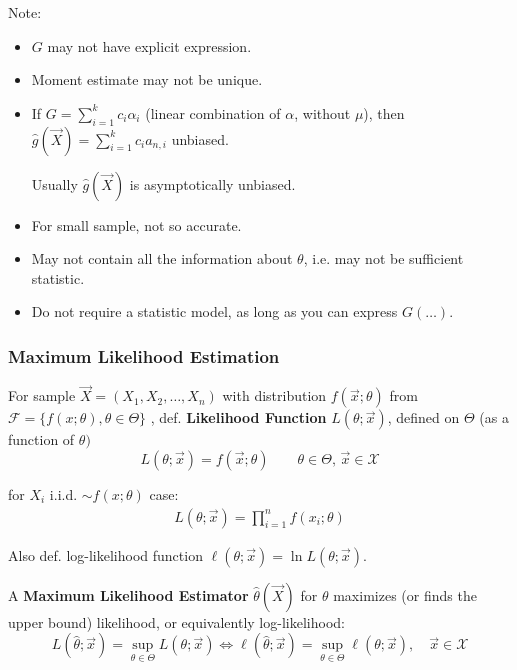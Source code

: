     \begin{point}
        Note:
    \end{point}
    
        
    \begin{itemize}
        \item $G$ may not have explicit expression.
        \item Moment estimate may not be unique.
        \item If $G={\displaystyle\sum_{i=1}^kc_i\alpha_i}$ (linear combination of $\alpha$, without $\mu$), then $\hat{g}(\vec{X})={\displaystyle\sum_{i=1}^kc_ia_{n,i}}$ unbiased.
        
        \qquad Usually $\hat{g}(\vec{X})$ is asymptotically unbiased.
        \item For small sample, not so accurate.
        \item May not contain all the information about $\theta$, i.e. may not be sufficient statistic.
        \item Do not require a statistic model, as long as you can express $ G(\ldots) $.
    \end{itemize}


\subsubsection{Maximum Likelihood Estimation}\label{SubSectionMLE}
    For sample $\vec{X}=(X_1,X_2,\ldots,X_n)$ with distribution $f(\vec{x};\theta)$ from $\mathscr{F}=\{f(x;\theta),\theta\in\Theta\}$ , def. \textbf{Likelihood Function} $L(\theta;\vec{x})$, defined on $\Theta$ (as a function of $\theta)$
    \begin{equation}
        L(\theta;\vec{x})=f(\vec{x};\theta)\qquad \theta\in\Theta,\,\vec{x}\in\mathscr{X}    
    \end{equation}

    for $ X_i $ i.i.d. $ \sim f(x;\theta ) $ case:
    \begin{align*}
        L(\theta ;\vec{x})=\prod_{i=1}^nf (x_i;\theta )
    \end{align*}
    
    

    Also def. log-likelihood function $\ell(\theta;\vec{x})=\ln L(\theta;\vec{x})$.

    A \textbf{Maximum Likelihood Estimator} $\hat{\theta}(\vec{X})$ for $ \theta  $ maximizes (or finds the upper bound) likelihood, or equivalently log-likelihood:
    \begin{equation}
        L(\hat{\theta};\vec{x})=\sup_{\theta\in\Theta}L(\theta;\vec{x})\Leftrightarrow \ell(\hat{\theta};\vec{x})=\sup_{\theta\in\Theta}\ell(\theta;\vec{x}) ,\quad \vec{x}\in\mathscr{X}
    \end{equation}

